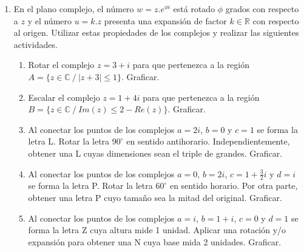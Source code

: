 \documentclass[a4paper]{article}
\newcommand{\exercise}{\item}
\newcommand{\df}[2]{\displaystyle\frac{#1}{#2}}
\begin{document}
\begin{enumerate}
	\exercise En el plano complejo, el número $w=z.e^{\phi i}$ está rotado $\phi$ grados con respecto a $z$ y el número $u=k.z$ presenta una expansión de factor $k\in \mathbb{R}$ con respecto al origen. Utilizar estas propiedades de los complejos y realizar las siguientes actividades.
	\begin{enumerate} [label=(\alph*)]
		
		\item Rotar el complejo $z=3+i$ para que pertenezca a la región $A=\{ z \in \mathbb{C} ~/~ |z+3| \leq 1 \}$. Graficar.

		\item Escalar el complejo $z=1+4i$ para que pertenezca a la región $B=\{ z \in \mathbb{C} ~/~ Im(z) \leq 2 - Re(z) \}$. Graficar.

		\item Al conectar los puntos de los complejos $a=2i$, $b=0$ y $c=1$ se forma la letra L. Rotar la letra $90^{\circ}$ en sentido antihorario. Independientemente, obtener una L cuyas dimensiones sean el triple de grandes. Graficar.

		\item Al conectar los puntos de los complejos $a=0$, $b=2i$, $c=1+\df{3}{2}i$ y $d=i$ se forma la letra P. Rotar la letra $60^{\circ}$ en sentido horario. Por otra parte, obtener una letra P cuyo tamaño sea la mitad del original. Graficar.

		\item Al conectar los puntos de los complejos $a=i$, $b=1+i$, $c=0$ y $d=1$ se forma la letra Z cuya altura mide 1 unidad. Aplicar una rotación y/o expansión para obtener una N cuya base mida 2 unidades. Graficar.

	\end{enumerate}


\end{enumerate}
\end{document}
